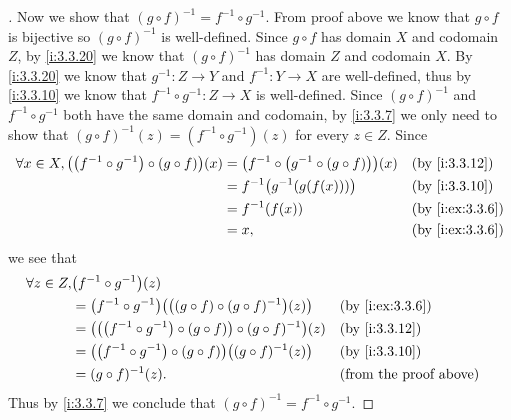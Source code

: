 \begin{proof}[]
  Now we show that \((g \circ f)^{-1} = f^{-1} \circ g^{-1}\).
  From proof above we know that \(g \circ f\) is bijective so \((g \circ f)^{-1}\) is well-defined.
  Since \(g \circ f\) has domain \(X\) and codomain \(Z\), by \cref{i:3.3.20} we know that \((g \circ f)^{-1}\) has domain \(Z\) and codomain \(X\).
  By \cref{i:3.3.20} we know that \(g^{-1} : Z \to Y\) and \(f^{-1} : Y \to X\) are well-defined, thus by \cref{i:3.3.10} we know that \(f^{-1} \circ g^{-1} : Z \to X\) is well-defined.
  Since \((g \circ f)^{-1}\) and \(f^{-1} \circ g^{-1}\) both have the same domain and codomain, by \cref{i:3.3.7} we only need to show that \((g \circ f)^{-1}(z) = (f^{-1} \circ g^{-1})(z)\) for every \(z \in Z\).
  Since
  \begin{align*}
    \forall x \in X, \pa{\pa{f^{-1} \circ g^{-1}} \circ (g \circ f)}(x) & = \pa{f^{-1} \circ \pa{g^{-1} \circ \pa{g \circ f}}}(x) &  & \by{i:3.3.12}   \\
                                                                        & = f^{-1}\pa{g^{-1}\pa{g(f(x))}}                         &  & \by{i:3.3.10}   \\
                                                                        & = f^{-1}(f(x))                                          &  & \by{i:ex:3.3.6} \\
                                                                        & = x,                                                    &  & \by{i:ex:3.3.6}
  \end{align*}
  we see that
  \begin{align*}
    \forall z \in Z, & \pa{f^{-1} \circ g^{-1}}(z)                                                                                         \\
                     & = \pa{f^{-1} \circ g^{-1}}\pa{\pa{(g \circ f) \circ (g \circ f)^{-1}}(z)}        &  & \by{i:ex:3.3.6}               \\
                     & = \pa{\pa{\pa{f^{-1} \circ g^{-1}} \circ (g \circ f)} \circ (g \circ f)^{-1}}(z) &  & \by{i:3.3.12}                 \\
                     & = \pa{\pa{f^{-1} \circ g^{-1}} \circ (g \circ f)}\pa{(g \circ f)^{-1}(z)}        &  & \by{i:3.3.10}                 \\
                     & = (g \circ f)^{-1}(z).                                                           &  & \text{(from the proof above)}
  \end{align*}
  Thus by \cref{i:3.3.7} we conclude that \((g \circ f)^{-1} = f^{-1} \circ g^{-1}\).
\end{proof}

